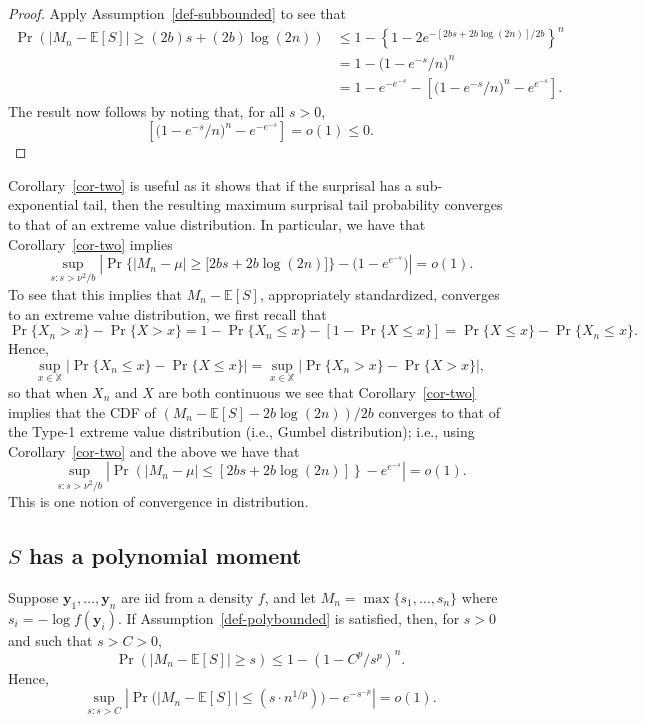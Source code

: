 \documentclass[
  12pt]{article}
\newcommand{\E}{\mathbb{E}}
\theoremstyle{definition}
\theoremstyle{plain}
\theoremstyle{plain}
\theoremstyle{plain}
\theoremstyle{remark}
\begin{document}
\begin{proof}
Apply Assumption~\ref{def-subbounded} to see that \begin{align*}
    \Pr\left(|M_n-\E[S]|\ge (2b)s+(2b)\log(2n)\right)
     & \le 1- \left\{1-2e^{-[2bs+2b\log(2n)]/2b}\right\}^n                       \\
     & = 1-\big(1-e^{-s}/n\big)^n                                     \\
     & = 1-e^{-e^{-s}}-\left[\big(1-e^{-s}/n\big)^n-e^{e^{-s}}\right].
\end{align*} The result now follows by noting that, for all \(s>0\), \[
    \left[\big(1-e^{-s}/n\big)^n-e^{-e^{-s}}\right]= o(1)\le 0.
\]
\end{proof}

Corollary~\ref{cor-two} is useful as it shows that if the surprisal has
a sub-exponential tail, then the resulting maximum surprisal tail
probability converges to that of an extreme value distribution. In
particular, we have that Corollary~\ref{cor-two} implies \[
    \sup_{s:s>\nu^2/b}\left|\Pr\Big\{|M_n-\mu|\ge \big[2bs+2b\log(2n)\big]\Big\}-\big(1-e^{e^{-s}}\big)\right| = o(1).
\] To see that this implies that \(M_n-\E[S]\), appropriately
standardized, converges to an extreme value distribution, we first
recall that \[
    \Pr\{X_n>x\}-\Pr\{X>x\}=1-\Pr\{X_n\le x\}-\left[1-\Pr\{X\le x\}\right]=\Pr\{X\le x\}-\Pr\{X_n\le x\}.
\] Hence, \[
    \sup_{x\in\mathbb{X}}|\Pr\{X_n\le x\}-\Pr\{X\le x\}|=\sup_{x\in\mathbb{X}}|\Pr\{X_n> x\}-\Pr\{X> x\}|,
\] so that when \(X_n\) and \(X\) are both continuous we see that
Corollary~\ref{cor-two} implies that the CDF of
\((M_n-\E[S]-2b\log(2n))/2b\) converges to that of the Type-1 extreme
value distribution (i.e., Gumbel distribution); i.e., using
Corollary~\ref{cor-two} and the above we have that \[
    \sup_{s:s>\nu^2/b}\left|\Pr\left(|M_n-\mu|\le [2bs+2b\log(2n)]\right\}-e^{e^{-s}}\right|=o(1).
\] This is one notion of convergence in distribution.

\subsection{\texorpdfstring{\(S\) has a polynomial
moment}{S has a polynomial moment}}\label{s-has-a-polynomial-moment}

\protect{}\label{lem:bounds_poly}
Suppose \(\bm{y}_1,\dots,\bm{y}_n\) are iid from a density \(f\), and
let \(M_n = \max\{s_1,\dots,s_n\}\) where \(s_i = -\log f(\bm{y}_i)\).
If Assumption~\ref{def-polybounded} is satisfied, then, for \(s>0\) and
such that \(s>C>0\), \[
  \Pr\left(|M_n-\E[S]|\ge s\right) \le 1- (1-C^p/s^p)^n.
\] Hence, \[
    \sup_{s:s>C} \left|\Pr\big(|M_n-\E[S]|\le (s\cdot n^{1/p})\big)-e^{-s^{-p}}\right|=o(1).
\]
\end{document}
